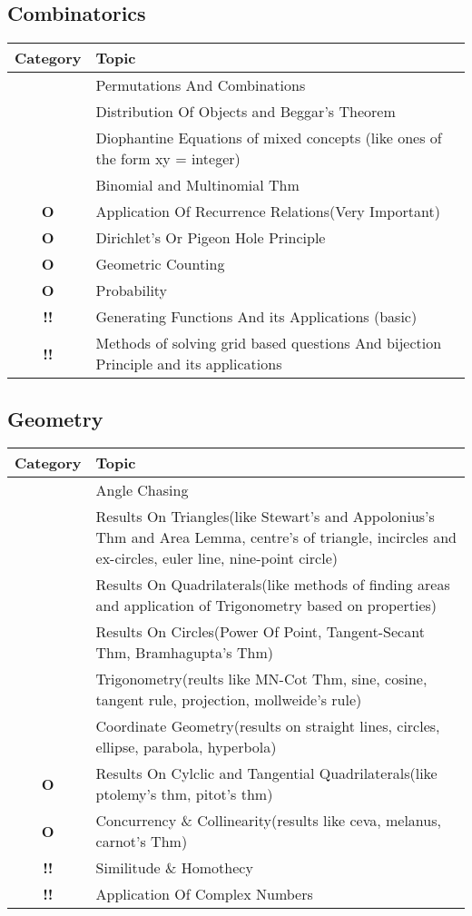 \documentclass[11pt]{scrartcl}
\providecommand{\isRq}{{\color{green!60!black}\CheckmarkBold}}
\providecommand{\isUs}{{\color{cyan}\sffamily\bfseries O}}
\providecommand{\isAv}{{\color{gray}\sffamily\bfseries !!}}
\begin{document}
  \subsection{Combinatorics}
  \begin{center}
    \begin{tabular}{cp{12cm}}
    \toprule Category & Topic \\ \midrule
    \isRq & Permutations And Combinations\\
    \isRq & Distribution Of Objects and Beggar's Theorem\\
    \isRq & Diophantine Equations of mixed concepts (like ones of the form xy = integer)\\
    \isRq & Binomial and Multinomial Thm\\
    \isUs & Application Of Recurrence Relations(Very Important)\\
    \isUs & Dirichlet's Or Pigeon Hole Principle\\
    \isUs & Geometric Counting\\
    \isUs & Probability\\
    \isAv & Generating Functions And its Applications (basic)\\
    \isAv & Methods of solving grid based questions And bijection Principle and its applications\\
    \bottomrule
  \end{tabular}
  \end{center}


  \subsection{Geometry}
  \begin{center}
    \begin{tabular}{cp{12cm}}
    \toprule Category & Topic \\ \midrule
    \isRq & Angle Chasing\\
    \isRq & Results On Triangles(like Stewart's and  Appolonius's Thm and Area Lemma, centre's of triangle, incircles and ex-circles, euler line, nine-point circle)\\
    \isRq & Results On Quadrilaterals(like methods of finding areas and application of Trigonometry based on properties)\\
    \isRq & Results On Circles(Power Of Point, Tangent-Secant Thm, Bramhagupta's Thm)\\
    \isRq & Trigonometry(reults like MN-Cot Thm, sine, cosine, tangent rule, projection, mollweide's rule)\\
    \isRq & Coordinate Geometry(results on straight lines, circles, ellipse, parabola, hyperbola)\\
    \isUs & Results On Cylclic and Tangential Quadrilaterals(like ptolemy's thm, pitot's thm)\\
    \isUs & Concurrency \& Collinearity(results like ceva, melanus, carnot's Thm)\\
    \isAv & Similitude \& Homothecy\\
    \isAv & Application Of Complex Numbers\\
    \bottomrule
  \end{tabular}
  \end{center}
\end{document}
